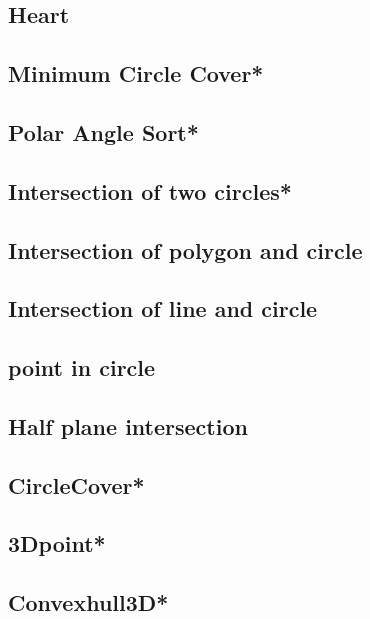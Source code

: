 \subsection{Heart}

\subsection{Minimum Circle Cover*} %

\subsection{Polar Angle Sort*} %

\subsection{Intersection of two circles*} %

\subsection{Intersection of polygon and circle}

\subsection{Intersection of line and circle}

\subsection{point in circle}

\subsection{Half plane intersection}

\subsection{CircleCover*} %

\subsection{3Dpoint*} %

\subsection{Convexhull3D*} %

